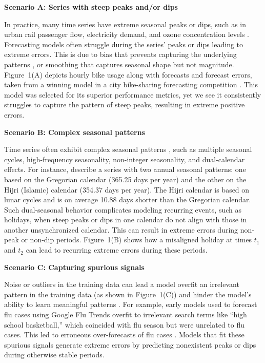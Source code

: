 \documentclass[12pt]{article}
\newenvironment{scenario}[1]{%
  \par\vspace{1ex}\noindent\textbf{#1}\par\vspace{0.5ex}}{\par}
\begin{document}
\begin{scenario}{Scenario A: Series with steep peaks and/or dips}
In practice, many time series have extreme seasonal peaks or dips, such as in urban rail passenger flow, electricity demand, and ozone concentration levels  \citep{li2024, amaraouali2023, marvin2022}. Forecasting models often struggle during the series' peaks or dips leading to extreme errors. This is due to bias that prevents capturing the underlying patterns \citep{lin2023}, or smoothing that captures seasonal shape but not magnitude. Figure~1(A) depicts hourly bike usage along with forecasts and forecast errors, taken from a winning model in a city bike-sharing forecasting competition \citep{mohit2020}. This model was selected for its superior performance metrics, yet we see it consistently struggles to capture the pattern of steep peaks, resulting in extreme positive errors.
\end{scenario}

\begin{scenario}{Scenario B: Complex seasonal patterns}

Time series often exhibit complex seasonal patterns \citep{zhao2024}, such as multiple seasonal cycles, high-frequency seasonality, non-integer seasonality, and dual-calendar effects. For instance, \cite{delivera2011} describe a series with two annual seasonal patterns: one based on the Gregorian calendar (365.25 days per year) and the other on the Hijri (Islamic) calendar (354.37 days per year). The Hijri calendar is based on lunar cycles and is on average 10.88 days shorter than the Gregorian calendar. Such dual-seasonal behavior complicates modeling recurring events, such as holidays, when steep peaks or dips in one calendar do not align with those in another unsynchronized calendar. This can %
result in extreme errors during non-peak or non-dip periods. %
Figure~1(B) shows %
how a misaligned holiday at times $t_1$ and $t_2$ can lead to recurring extreme errors during these periods.
\end{scenario}

\begin{scenario}{Scenario C: Capturing spurious signals}

Noise or outliers in the training data can lead a model overfit an irrelevant pattern in the training data (as shown in Figure~1(C)) and hinder the model's ability to learn meaningful patterns \citep{cakmak2024}. For example, early models used to forecast flu cases using Google Flu Trends overfit to irrelevant search terms like ``high school basketball,'' which coincided with flu season but were unrelated to flu cases. This led to erroneous over-forecasts of flu cases \citep{lazer2014}. Models that fit these spurious signals generate extreme errors by predicting nonexistent peaks or dips during otherwise stable periods.
\end{scenario}
\end{document}
